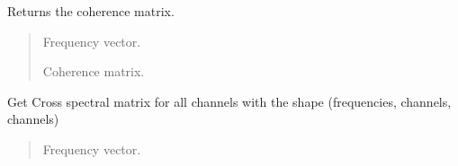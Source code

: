 \documentclass[letterpaper,10pt,english]{sphinxmanual}
\begin{document}
\begin{fulllineitems}
\begin{fulllineitems}
\begin{quote}
\begin{description}
\begin{description}
\end{description}

\end{description}\end{quote}

\end{fulllineitems}


\begin{fulllineitems}
\label{\detokenize{classes:dsptoolbox.classes.signal_class.Signal.get_coherence}}
\pysigstartsignatures
{}
\pysigstopsignatures
\sphinxAtStartPar
Returns the coherence matrix.
\begin{quote}\begin{description}
\begin{description}
\sphinxlineitem{\sphinxstylestrong{f}}{[}\sphinxtitleref{np.ndarray}{]}
\sphinxAtStartPar
Frequency vector.

\sphinxlineitem{\sphinxstylestrong{coherence}}{[}\sphinxtitleref{np.ndarray}{]}
\sphinxAtStartPar
Coherence matrix.

\end{description}

\end{description}\end{quote}

\end{fulllineitems}


\begin{fulllineitems}
\label{\detokenize{classes:dsptoolbox.classes.signal_class.Signal.get_csm}}
\pysigstartsignatures
{}
\pysigstopsignatures
\sphinxAtStartPar
Get Cross spectral matrix for all channels with the shape
(frequencies, channels, channels)
\begin{quote}\begin{description}
\begin{description}
\sphinxlineitem{\sphinxstylestrong{f\_csm}}{[}\sphinxtitleref{np.ndarray}{]}
\sphinxAtStartPar
Frequency vector.


\end{description}
\end{description}
\end{quote}
\end{fulllineitems}
\end{fulllineitems}
\end{document}
